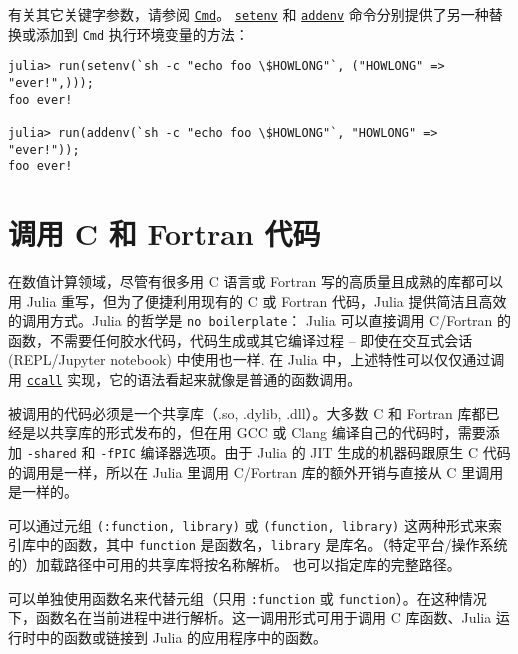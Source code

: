 有关其它关键字参数，请参阅 \hyperlink{10541952265148699805}{\texttt{Cmd}}。 \hyperlink{14476048880059260855}{\texttt{setenv}} 和 \hyperlink{274817159920864187}{\texttt{addenv}} 命令分别提供了另一种替换或添加到 \texttt{Cmd} 执行环境变量的方法：




\begin{verbatim}
julia> run(setenv(`sh -c "echo foo \$HOWLONG"`, ("HOWLONG" => "ever!",)));
foo ever!

julia> run(addenv(`sh -c "echo foo \$HOWLONG"`, "HOWLONG" => "ever!"));
foo ever!
\end{verbatim}



\hypertarget{12701135342622507818}{}


\chapter{调用 C 和 Fortran 代码}



在数值计算领域，尽管有很多用 C 语言或 Fortran 写的高质量且成熟的库都可以用 Julia 重写，但为了便捷利用现有的 C 或 Fortran 代码，Julia 提供简洁且高效的调用方式。Julia 的哲学是 \texttt{no boilerplate}： Julia 可以直接调用 C/Fortran 的函数，不需要任何{\textquotedbl}胶水{\textquotedbl}代码，代码生成或其它编译过程 – 即使在交互式会话 (REPL/Jupyter notebook) 中使用也一样. 在 Julia 中，上述特性可以仅仅通过调用 \hyperlink{14245046751182637566}{\texttt{ccall}} 实现，它的语法看起来就像是普通的函数调用。



被调用的代码必须是一个共享库（.so, .dylib, .dll）。大多数 C 和 Fortran 库都已经是以共享库的形式发布的，但在用 GCC 或 Clang 编译自己的代码时，需要添加 \texttt{-shared} 和 \texttt{-fPIC} 编译器选项。由于 Julia 的 JIT 生成的机器码跟原生 C 代码的调用是一样，所以在 Julia 里调用 C/Fortran 库的额外开销与直接从 C 里调用是一样的。\footnotemark[1]



可以通过元组 \texttt{(:function, {\textquotedbl}library{\textquotedbl})} 或 \texttt{({\textquotedbl}function{\textquotedbl}, {\textquotedbl}library{\textquotedbl})} 这两种形式来索引库中的函数，其中 \texttt{function} 是函数名，\texttt{library} 是库名。（特定平台/操作系统的）加载路径中可用的共享库将按名称解析。 也可以指定库的完整路径。



可以单独使用函数名来代替元组（只用 \texttt{:function} 或 \texttt{{\textquotedbl}function{\textquotedbl}}）。在这种情况下，函数名在当前进程中进行解析。这一调用形式可用于调用 C 库函数、Julia 运行时中的函数或链接到 Julia 的应用程序中的函数。



